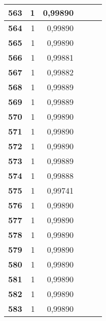 {\begin{longtable}{|r|r|r|l|r|r|}
\textbf{563} & 1 & 0,99890 &  & \multicolumn{1}{l|}{} & \multicolumn{1}{l|}{} \\ \hline
\textbf{564} & 1 & 0,99890 &  & \multicolumn{1}{l|}{} & \multicolumn{1}{l|}{} \\ \hline
\textbf{565} & 1 & 0,99890 &  & \multicolumn{1}{l|}{} & \multicolumn{1}{l|}{} \\ \hline
\textbf{566} & 1 & 0,99881 &  & \multicolumn{1}{l|}{} & \multicolumn{1}{l|}{} \\ \hline
\textbf{567} & 1 & 0,99882 &  & \multicolumn{1}{l|}{} & \multicolumn{1}{l|}{} \\ \hline
\textbf{568} & 1 & 0,99889 &  & \multicolumn{1}{l|}{} & \multicolumn{1}{l|}{} \\ \hline
\textbf{569} & 1 & 0,99889 &  & \multicolumn{1}{l|}{} & \multicolumn{1}{l|}{} \\ \hline
\textbf{570} & 1 & 0,99890 &  & \multicolumn{1}{l|}{} & \multicolumn{1}{l|}{} \\ \hline
\textbf{571} & 1 & 0,99890 &  & \multicolumn{1}{l|}{} & \multicolumn{1}{l|}{} \\ \hline
\textbf{572} & 1 & 0,99890 &  & \multicolumn{1}{l|}{} & \multicolumn{1}{l|}{} \\ \hline
\textbf{573} & 1 & 0,99889 &  & \multicolumn{1}{l|}{} & \multicolumn{1}{l|}{} \\ \hline
\textbf{574} & 1 & 0,99888 &  & \multicolumn{1}{l|}{} & \multicolumn{1}{l|}{} \\ \hline
\textbf{575} & 1 & 0,99741 &  & \multicolumn{1}{l|}{} & \multicolumn{1}{l|}{} \\ \hline
\textbf{576} & 1 & 0,99890 &  & \multicolumn{1}{l|}{} & \multicolumn{1}{l|}{} \\ \hline
\textbf{577} & 1 & 0,99890 &  & \multicolumn{1}{l|}{} & \multicolumn{1}{l|}{} \\ \hline
\textbf{578} & 1 & 0,99890 &  & \multicolumn{1}{l|}{} & \multicolumn{1}{l|}{} \\ \hline
\textbf{579} & 1 & 0,99890 &  & \multicolumn{1}{l|}{} & \multicolumn{1}{l|}{} \\ \hline
\textbf{580} & 1 & 0,99890 &  & \multicolumn{1}{l|}{} & \multicolumn{1}{l|}{} \\ \hline
\textbf{581} & 1 & 0,99890 &  & \multicolumn{1}{l|}{} & \multicolumn{1}{l|}{} \\ \hline
\textbf{582} & 1 & 0,99890 &  & \multicolumn{1}{l|}{} & \multicolumn{1}{l|}{} \\ \hline
\textbf{583} & 1 & 0,99890 &  & \multicolumn{1}{l|}{} & \multicolumn{1}{l|}{} \\ \hline

\end{longtable}}
